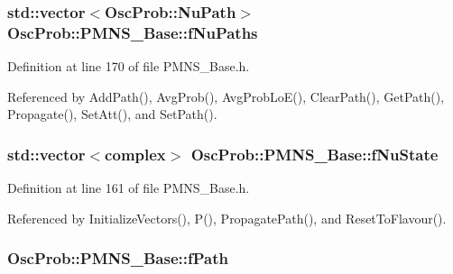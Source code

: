 \subsubsection[{\texorpdfstring{f\+Nu\+Paths}{fNuPaths}}]{\setlength{\rightskip}{0pt plus 5cm}std\+::vector$<${\bf Osc\+Prob\+::\+Nu\+Path}$>$ Osc\+Prob\+::\+P\+M\+N\+S\+\_\+\+Base\+::f\+Nu\+Paths\hspace{0.3cm}{\ttfamily [protected]}}\hypertarget{classOscProb_1_1PMNS__Base_a69db9d57e12fc7cbe0431bc6c18fac93}{}\label{classOscProb_1_1PMNS__Base_a69db9d57e12fc7cbe0431bc6c18fac93}


Definition at line 170 of file P\+M\+N\+S\+\_\+\+Base.\+h.



Referenced by Add\+Path(), Avg\+Prob(), Avg\+Prob\+Lo\+E(), Clear\+Path(), Get\+Path(), Propagate(), Set\+Att(), and Set\+Path().

\subsubsection[{\texorpdfstring{f\+Nu\+State}{fNuState}}]{\setlength{\rightskip}{0pt plus 5cm}std\+::vector$<${\bf complex}$>$ Osc\+Prob\+::\+P\+M\+N\+S\+\_\+\+Base\+::f\+Nu\+State\hspace{0.3cm}{\ttfamily [protected]}}\hypertarget{classOscProb_1_1PMNS__Base_ad38a7107c3ab393591fd5ba21658300b}{}\label{classOscProb_1_1PMNS__Base_ad38a7107c3ab393591fd5ba21658300b}


Definition at line 161 of file P\+M\+N\+S\+\_\+\+Base.\+h.



Referenced by Initialize\+Vectors(), P(), Propagate\+Path(), and Reset\+To\+Flavour().

\subsubsection[{\texorpdfstring{f\+Path}{fPath}}]{ Osc\+Prob\+::\+P\+M\+N\+S\+\_\+\+Base\+::f\+Path\hspace{0.3cm}{\ttfamily [protected]}}\hypertarget{classOscProb_1_1PMNS__Base_a849437aa8891fe042e86886ce8f81c6e}{}\label{classOscProb_1_1PMNS__Base_a849437aa8891fe042e86886ce8f81c6e}


